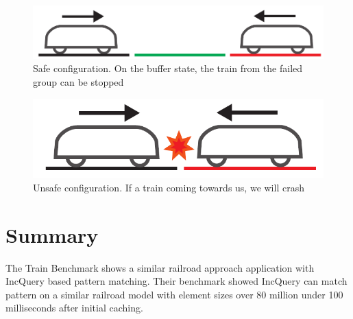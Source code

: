 \newpage
\begin{figure}[H]
	\centering
	\includegraphics[width=0.7\linewidth]{include/figures/chapter_6/failsafe/safe}
	\caption{Safe configuration. On the buffer state, the train from the failed group can be stopped}
	\label{fig:case_study:safe}
\end{figure}

\begin{figure}[H]
	\centering
	\includegraphics[width=0.5\linewidth]{include/figures/chapter_6/failsafe/unsafe}
	\caption{Unsafe configuration. If a train coming towards us, we will crash}
	\label{fig:case_study:unsafe}
\end{figure}

\section{Summary}

The Train Benchmark\cite{TrainBenchmark} shows a similar railroad approach application with IncQuery based pattern matching. Their benchmark showed IncQuery can match pattern on a similar railroad model with element sizes over 80 million under 100 milliseconds after initial caching.